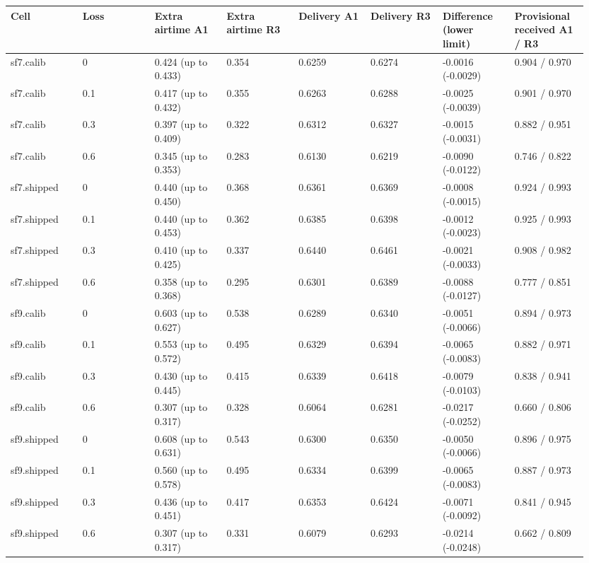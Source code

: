 {\scriptsize\raggedright
\begin{longtable}{p{0.119\linewidth}p{0.119\linewidth}p{0.119\linewidth}p{0.119\linewidth}p{0.119\linewidth}p{0.119\linewidth}p{0.119\linewidth}p{0.119\linewidth}}
\toprule
Cell & Loss & Extra airtime A1 & Extra airtime R3 & Delivery A1 & Delivery R3 & Difference (lower limit) & Provisional received A1 / R3 \\
\midrule
\endhead
sf7.calib & 0 & 0.424 (up to 0.433) & 0.354 & 0.6259 & 0.6274 & -0.0016 (-0.0029) & 0.904 / 0.970 \\
sf7.calib & 0.1 & 0.417 (up to 0.432) & 0.355 & 0.6263 & 0.6288 & -0.0025 (-0.0039) & 0.901 / 0.970 \\
sf7.calib & 0.3 & 0.397 (up to 0.409) & 0.322 & 0.6312 & 0.6327 & -0.0015 (-0.0031) & 0.882 / 0.951 \\
sf7.calib & 0.6 & 0.345 (up to 0.353) & 0.283 & 0.6130 & 0.6219 & -0.0090 (-0.0122) & 0.746 / 0.822 \\
sf7.shipped & 0 & 0.440 (up to 0.450) & 0.368 & 0.6361 & 0.6369 & -0.0008 (-0.0015) & 0.924 / 0.993 \\
sf7.shipped & 0.1 & 0.440 (up to 0.453) & 0.362 & 0.6385 & 0.6398 & -0.0012 (-0.0023) & 0.925 / 0.993 \\
sf7.shipped & 0.3 & 0.410 (up to 0.425) & 0.337 & 0.6440 & 0.6461 & -0.0021 (-0.0033) & 0.908 / 0.982 \\
sf7.shipped & 0.6 & 0.358 (up to 0.368) & 0.295 & 0.6301 & 0.6389 & -0.0088 (-0.0127) & 0.777 / 0.851 \\
sf9.calib & 0 & 0.603 (up to 0.627) & 0.538 & 0.6289 & 0.6340 & -0.0051 (-0.0066) & 0.894 / 0.973 \\
sf9.calib & 0.1 & 0.553 (up to 0.572) & 0.495 & 0.6329 & 0.6394 & -0.0065 (-0.0083) & 0.882 / 0.971 \\
sf9.calib & 0.3 & 0.430 (up to 0.445) & 0.415 & 0.6339 & 0.6418 & -0.0079 (-0.0103) & 0.838 / 0.941 \\
sf9.calib & 0.6 & 0.307 (up to 0.317) & 0.328 & 0.6064 & 0.6281 & -0.0217 (-0.0252) & 0.660 / 0.806 \\
sf9.shipped & 0 & 0.608 (up to 0.631) & 0.543 & 0.6300 & 0.6350 & -0.0050 (-0.0066) & 0.896 / 0.975 \\
sf9.shipped & 0.1 & 0.560 (up to 0.578) & 0.495 & 0.6334 & 0.6399 & -0.0065 (-0.0083) & 0.887 / 0.973 \\
sf9.shipped & 0.3 & 0.436 (up to 0.451) & 0.417 & 0.6353 & 0.6424 & -0.0071 (-0.0092) & 0.841 / 0.945 \\
sf9.shipped & 0.6 & 0.307 (up to 0.317) & 0.331 & 0.6079 & 0.6293 & -0.0214 (-0.0248) & 0.662 / 0.809 \\
\bottomrule
\end{longtable}}

